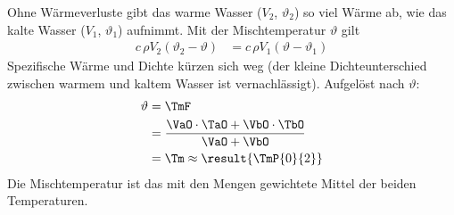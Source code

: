 Ohne Wärmeverluste gibt das warme Wasser ($V_2$, $\vartheta_2$) so viel Wärme ab, wie das kalte Wasser ($V_1$, $\vartheta_1$) aufnimmt. Mit der Mischtemperatur $\vartheta$ gilt
\begin{align}
 c\,\rho V_2\left(\vartheta_2-\vartheta\right) &= c\,\rho V_1\left(\vartheta-\vartheta_1\right)
\end{align}
Spezifische Wärme und Dichte kürzen sich weg (der kleine Dichteunterschied zwischen warmem und kaltem Wasser ist vernachlässigt). Aufgelöst nach $\vartheta$:
\begin{align}
 \vartheta &= \TmF \\
   &= \frac{\VaO\cdot\TaO+\VbO\cdot\TbO}{\VaO+\VbO} \\
   &= \Tm \approx \result{\TmP{0}{2}}
\end{align}
Die Mischtemperatur ist das mit den Mengen gewichtete Mittel der beiden Temperaturen.

